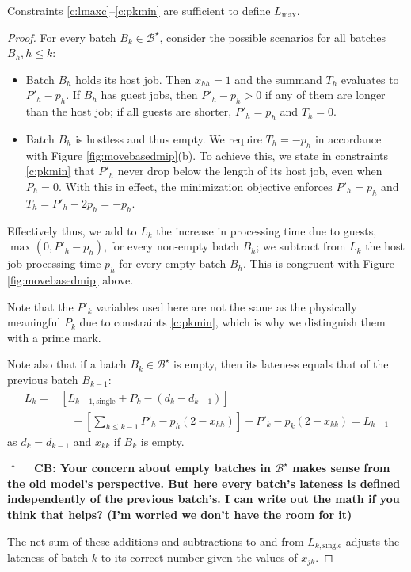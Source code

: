\documentclass[oribibl]{llncs}
\def\Lmax{{L_{\mathrm{max}}}}
\begin{document}
\begin{proposition}
  Constraints \eqref{c:lmaxc}--\eqref{c:pkmin} are sufficient to define $\Lmax$.
\end{proposition}
\begin{proof}
  For every batch $B_k \in \mathcal{B}^\star$, consider the possible scenarios for all batches
$B_h, h \leq k$:
\begin{itemize}
  \item{Batch $B_h$ holds its host job. Then $x_{hh}=1$ and the summand $T_h$ evaluates
      to $P'_h - p_h$. If $B_h$ has guest jobs, then $P'_h - p_h > 0$ if any of
      them are longer than the host job; if all guests are shorter, $P'_h=p_h$
    and $T_h = 0$.}
  \item{Batch $B_h$ is hostless and thus empty. We require $T_h = -p_h$ in
      accordance with Figure \ref{fig:movebasedmip}(b). To achieve this, we
      state in constraints \eqref{c:pkmin} that $P'_h$ never drop below the
      length of its host job, even when $P_h=0$. With this in effect, the
      minimization objective enforces $P'_h = p_h$ and $T_h = P'_h - 2p_h =
    -p_h$.}
\end{itemize}
Effectively thus, we add to $L_k$ the increase in processing time due
to guests, $\max(0, P'_h-p_h)$, for every non-empty batch $B_h$; we
subtract from $L_k$ the host job processing time $p_h$ for every empty
batch $B_h$. This is congruent with Figure \ref{fig:movebasedmip} above.

Note that the $P'_k$ variables used here are not the same as the
physically meaningful $P_k$ due to constraints \eqref{c:pkmin}, which is
why we distinguish them with a prime mark.

Note also that if a batch $B_k \in \mathcal{B}^\star$ is empty, then its
lateness equals that of the previous batch $B_{k-1}$: 
\begin{align*}
L_k =
&\left[L_{{k-1},\mathrm{single}} + P_k - (d_k - d_{k-1})\right] \\&\quad+\left[\sum_{h\leq k-1}
P'_h-p_h(2-x_{hh}) \right] + P'_k - p_k(2-x_{kk}) = L_{k-1}
\end{align*}
as $d_k = d_{k-1}$
and $x_{kk}$ if $B_k$ is empty.

\textbf{$\uparrow\quad$ CB: Your concern about empty batches in
$\mathcal{B}^\star$ makes sense from the old model's perspective. But here every
batch's lateness is defined independently of the previous batch's. I can write
out the math if you think that helps? (I'm worried we don't have the room for it) }


The net sum of these additions and subtractions to and from
$L_{k,\mathrm{single}}$ adjusts the lateness of batch $k$ to its correct number
given the values of $x_{jk}$.
\end{proof}
\end{document}
